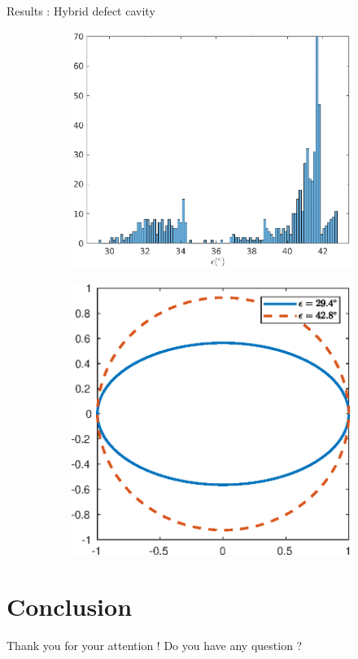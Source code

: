 \documentclass[aspectratio=169]{beamer}
\begin{document}
\begin{frame}{Results : Hybrid defect cavity}
	\begin{figure}
		\centering
		\begin{subfigure}{0.49\linewidth}
			\includegraphics[width=\linewidth]{plots/hybrid_defect/purity}
		\end{subfigure}
		\begin{subfigure}{0.49\linewidth}
			\includegraphics[width=\linewidth]{plots/hybrid_defect/ellipses}
		\end{subfigure}
	\end{figure}
\end{frame}

\section{Conclusion}

\begin{frame}
	\centering
	{\Huge Thank you for your attention !}
	\vfill
	{Do you have any question ?}
\end{frame}
\end{document}
